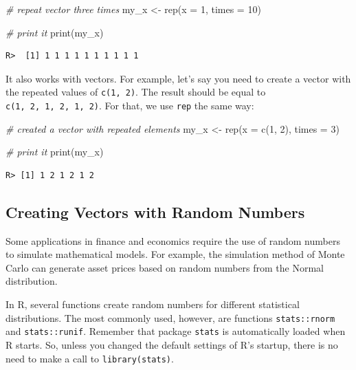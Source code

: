 \documentclass[
  12pt,
]{book}
\newenvironment{Shaded}{\begin{snugshade}}{\end{snugshade}}
\newcommand{\AttributeTok}[1]{\textcolor[rgb]{0.61,0.61,0.61}{#1}}
\newcommand{\CommentTok}[1]{\textcolor[rgb]{0.37,0.37,0.37}{\textit{#1}}}
\newcommand{\DecValTok}[1]{\textcolor[rgb]{0.06,0.06,0.06}{#1}}
\newcommand{\FunctionTok}[1]{\textcolor[rgb]{0,0,0}{#1}}
\newcommand{\NormalTok}[1]{#1}
\newcommand{\OtherTok}[1]{\textcolor[rgb]{0.37,0.37,0.37}{#1}}
\begin{document}
\begin{Shaded}
\begin{Highlighting}[]
\CommentTok{\# repeat vector three times}
\NormalTok{my\_x }\OtherTok{\textless{}{-}} \FunctionTok{rep}\NormalTok{(}\AttributeTok{x =} \DecValTok{1}\NormalTok{, }\AttributeTok{times =} \DecValTok{10}\NormalTok{)}

\CommentTok{\# print it}
\FunctionTok{print}\NormalTok{(my\_x)}
\end{Highlighting}
\end{Shaded}

\begin{verbatim}
R>  [1] 1 1 1 1 1 1 1 1 1 1
\end{verbatim}

It also works with vectors. For example, let's say you need to create a vector with the repeated values of \texttt{c(1,\ 2)}. The result should be equal to \texttt{c(1,\ 2,\ 1,\ 2,\ 1,\ 2)}. For that, we use \texttt{rep} the same way:

\begin{Shaded}
\begin{Highlighting}[]
\CommentTok{\# created a vector with repeated elements}
\NormalTok{my\_x }\OtherTok{\textless{}{-}} \FunctionTok{rep}\NormalTok{(}\AttributeTok{x =} \FunctionTok{c}\NormalTok{(}\DecValTok{1}\NormalTok{, }\DecValTok{2}\NormalTok{), }
            \AttributeTok{times =} \DecValTok{3}\NormalTok{)}

\CommentTok{\# print it}
\FunctionTok{print}\NormalTok{(my\_x)}
\end{Highlighting}
\end{Shaded}

\begin{verbatim}
R> [1] 1 2 1 2 1 2
\end{verbatim}

\hypertarget{creating-vectors-with-random-numbers}{%
\subsection{Creating Vectors with Random Numbers}\label{creating-vectors-with-random-numbers}}

Some applications in finance and economics require the use of random numbers to simulate mathematical models. For example, the simulation method of Monte Carlo can generate asset prices based on random numbers from the Normal distribution.

In R, several functions create random numbers for different statistical distributions. The most commonly used, however, are functions \texttt{stats::rnorm} and \texttt{stats::runif}. Remember that package \texttt{stats} is automatically loaded when R starts. So, unless you changed the default settings of R's startup, there is no need to make a call to \texttt{library(stats)}.  
\end{document}
